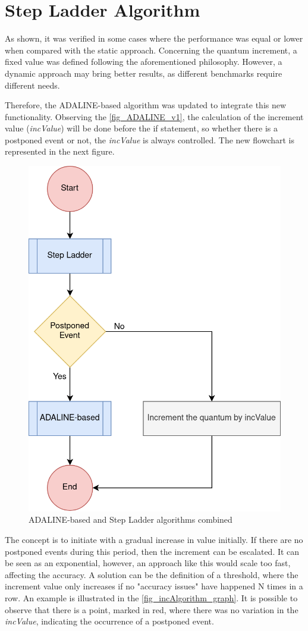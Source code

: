 \section{Step Ladder Algorithm}

As shown, it was verified in some cases where the performance was equal or lower when compared with the static approach. Concerning the quantum 
increment, a fixed value was defined following the aforementioned philosophy. However, a dynamic approach may bring better results, as different 
benchmarks require different needs. 

Therefore, the ADALINE-based algorithm was updated to integrate this new functionality. Observing the \autoref{fig_ADALINE_v1}, the calculation of the 
increment value (\textit{incValue}) will be done before the if statement, so whether there is a postponed event or not, the \textit{incValue} is always controlled. 
The new flowchart is represented in the next figure.

\begin{figure}[H]
	\centering
 	\includegraphics[width=0.32\linewidth]{Images/ADALINE_v2.png}
 	\caption{ADALINE-based and Step Ladder algorithms combined}
	 \label{fig_ADALINE_v2}
\end{figure}

The concept is to initiate with a gradual increase in value initially. If there are no postponed events during this period, then the increment 
can be escalated. It can be seen as an exponential, however, an approach like this would scale too fast, affecting the accuracy. A solution can be 
the definition of a threshold, where the increment value only increases if no "accuracy issues" have happened N times in a row. An example is 
illustrated in the \autoref{fig_incAlgorithm_graph}. It is possible to observe that there is a point, marked in red, 
where there was no variation in the \textit{incValue}, indicating the occurrence of a postponed event.

